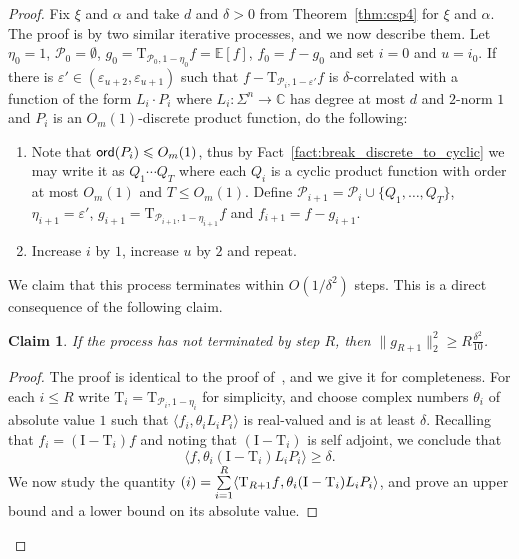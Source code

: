\documentclass[10pt,a4paper]{amsart}
\newtheorem{claim}[thm]{Claim}
\newcommand\E{\mathbb{E}}
\newcommand\norm[1]{\| #1 \|}
\newcommand\inner[2]{\langle{#1},{#2}\rangle}
\newcommand\eps{\varepsilon}
\renewcommand\geq{\geqslant}
\renewcommand\leq{\leqslant}
\newcommand{\rom}[1]{\uppercase\expandafter{\romannumeral #1\relax}}
\begin{document}
\begin{proof}
    Fix $\xi$ and $\alpha$ and take $d$ and $\delta>0$ from Theorem~\ref{thm:csp4} for $\xi$ and $\alpha$. 
    The proof is by two similar iterative processes, and we now describe them.
    Let $\eta_0=1$,   $\mathcal{P}_0 = \emptyset$, $g_0 = \mathrm{T}_{\mathcal{P}_0,1-\eta_0}f = \E[f]$,
    $f_0 = f-g_0$ and set $i=0$ and $u=i_0$. If there is $\eps'\in (\eps_{u+2},\eps_{u+1})$ such that $f-\mathrm{T}_{\mathcal{P}_{i},1-\eps'}f$ is $\delta$-correlated with a function of the form $L_i\cdot P_i$ where $L_i\colon \Sigma^{n}\to\mathbb{C}$ has degree at most $d$ and $2$-norm $1$ and $P_i$ is an $O_{m}(1)$-discrete product function, do the following:
    \begin{enumerate}
        \item Note that ${\sf ord}(P_i)\leq O_{m}(1)$, thus by Fact~\ref{fact:break_discrete_to_cyclic} we may write it as $Q_1\cdots Q_T$ where each $Q_i$ is a cyclic product function with order at most $O_{m}(1)$ and $T\leq O_{m}(1)$.   Define $\mathcal{P}_{i+1}=\mathcal{P}_i\cup \{Q_1,\ldots,Q_T\}$,
        $\eta_{i+1} = \eps'$,
        $g_{i+1} = \mathrm{T}_{\mathcal{P}_{i+1}, 1-\eta_{i+1}} f$ and $f_{i+1} = f-g_{i+1}$.
        \item Increase $i$ by $1$, increase $u$ by $2$ and repeat.
    \end{enumerate}
    We claim that this process terminates within $O(1/\delta^2)$ steps. This is a direct consequence of the following claim. 
    \begin{claim}\label{claim:it_process_key}
        If the process has not terminated by step $R$, 
        then $\norm{g_{R+1}}_2^2\geq R\frac{\delta^2}{10}$.
    \end{claim}
    \begin{proof}
        The proof is identical to the proof of~\cite[Claim 5.2]{BKM5}, and we give it for completeness. For each $i\leq R$ write $\mathrm{T}_i = \mathrm{T}_{\mathcal{P}_i,1-\eta_i}$ for simplicity, and choose complex numbers $\theta_i$ of absolute value $1$ such that 
        $\inner{f_i}{\theta_i L_i P_i}$ is real-valued and is at least $\delta$. Recalling that $f_i = (\mathrm{I}-\mathrm{T}_i)f$ and noting that $(\mathrm{I}-\mathrm{T}_i)$ is self adjoint, we conclude that
        \[
        \inner{f}{\theta_i (\mathrm{I}-\mathrm{T}_i)L_i P_i}\geq \delta.
        \]
        We now study the quantity $(\rom{1}) = \sum\limits_{i=1}^{R}\inner{\mathrm{T}_{R+1}f}{\theta_i (\mathrm{I}-\mathrm{T}_i)L_i P_i}$, and prove an upper bound and a lower bound on its absolute value.

\end{proof}
\end{proof}
\end{document}
